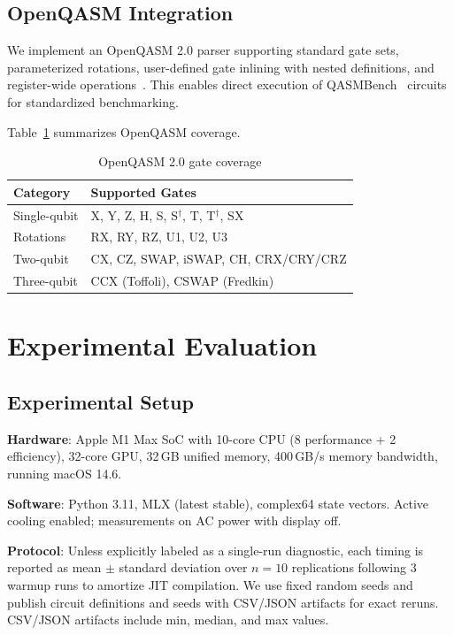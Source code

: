 \documentclass[runningheads]{llncs}
\begin{document}
\subsection{OpenQASM Integration}

We implement an OpenQASM 2.0 parser supporting standard gate sets, parameterized rotations, user-defined gate inlining with nested definitions, and register-wide operations~\cite{OpenQASM2017}. This enables direct execution of QASMBench~\cite{QASMBench2020} circuits for standardized benchmarking.

Table~\ref{tab:qasm-coverage} summarizes OpenQASM coverage.

\begin{table}[t]
\caption{OpenQASM 2.0 gate coverage}
\label{tab:qasm-coverage}
\centering
\footnotesize
\begin{tabular}{ll}
\toprule
Category & Supported Gates \\
\midrule
Single-qubit & X, Y, Z, H, S, S$^\dagger$, T, T$^\dagger$, SX \\
Rotations & RX, RY, RZ, U1, U2, U3 \\
Two-qubit & CX, CZ, SWAP, iSWAP, CH, CRX/CRY/CRZ \\
Three-qubit & CCX (Toffoli), CSWAP (Fredkin) \\
\bottomrule
\end{tabular}
\end{table}

\section{Experimental Evaluation}

\subsection{Experimental Setup}

\textbf{Hardware}: Apple M1 Max SoC with 10-core CPU (8 performance + 2 efficiency), 32-core GPU, 32\,GB unified memory, 400\,GB/s memory bandwidth, running macOS 14.6.

\textbf{Software}: Python 3.11, MLX (latest stable), complex64 state vectors. Active cooling enabled; measurements on AC power with display off.

\textbf{Protocol}: Unless explicitly labeled as a single-run diagnostic, each timing is reported as mean $\pm$ standard deviation over $n=10$ replications following 3 warmup runs to amortize JIT compilation. We use fixed random seeds and publish circuit definitions and seeds with CSV/JSON artifacts for exact reruns. CSV/JSON artifacts include min, median, and max values.
\end{document}
